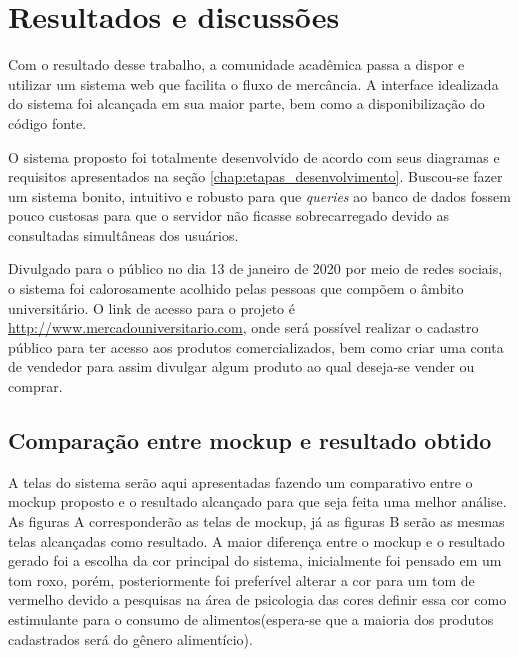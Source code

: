 \chapter{Resultados e discussões}
\label{chap:resultados}

Com o resultado desse trabalho, a comunidade acadêmica passa a dispor e utilizar um sistema web que facilita o fluxo de mercância. A interface idealizada do sistema foi alcançada em sua maior parte, bem como a disponibilização do código fonte.

O sistema proposto foi totalmente desenvolvido de acordo com seus diagramas e requisitos apresentados na seção \ref{chap:etapas_desenvolvimento}. Buscou-se fazer um sistema bonito, intuitivo e robusto para que \textit{queries} ao banco de dados fossem pouco custosas para que o servidor não ficasse sobrecarregado devido as consultadas simultâneas dos usuários.

Divulgado para o público no dia 13 de janeiro de 2020 por meio de redes sociais, o sistema foi calorosamente acolhido pelas pessoas que compõem o âmbito universitário. O link de acesso para o projeto é \url{http://www.mercadouniversitario.com}, onde será possível realizar o cadastro público para ter acesso aos produtos comercializados, bem como criar uma conta de vendedor para assim divulgar algum produto ao qual deseja-se vender ou comprar.

\section{Comparação entre mockup e resultado obtido}

A telas do sistema serão aqui apresentadas fazendo um comparativo entre o mockup proposto e o resultado alcançado para que seja feita uma melhor análise. As figuras A corresponderão as telas de mockup, já as figuras B serão as mesmas telas alcançadas como resultado. A maior diferença entre o mockup e o resultado gerado foi a escolha da cor principal do sistema, inicialmente foi pensado em um tom roxo, porém, posteriormente foi preferível alterar a cor para um tom de vermelho devido a pesquisas na área de psicologia das cores definir essa cor como estimulante para o consumo de alimentos(espera-se que a maioria dos produtos cadastrados será do gênero alimentício).

